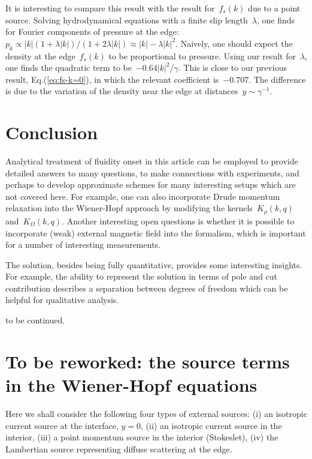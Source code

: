 \documentclass[preprint,aps,eqsecnum]{revtex4-1}
\begin{document}
It is interesting to compare this result with the result for~$f_s(k)$
due to a point source. Solving hydrodynamical equations with a finite
slip length~$\lambda$, one finds for Fourier components of
pressure at the edge:
$p_k \propto |k| (1 + \lambda |k|)/(1 + 2 \lambda|k|)
\approx |k| - \lambda |k|^2$. Naively, one should expect the
density at the edge~$f_s(k)$ to be proportional to pressure.
Using our result for~$\lambda$, one
finds the quadratic term to be~$-0.64 |k|^2/\gamma$. This is close
to our previous result, Eq.(\ref{eq:fs-k=0}), in which the relevant
coefficient is~$-0.707$. The difference is due to the variation
of the density near the edge at distances~$y\sim\gamma^{-1}$.

\section{Conclusion}
\label{sec:conclusion}



Analytical treatment of fluidity onset in this article can be employed
to provide detailed answers to many questions, to make connections with
experiments, and perhaps to develop approximate schemes for many
interesting setups which are not covered here.
For example, one can also incorporate Drude momentum relaxation into
the Wiener-Hopf approach by modifying the kernels~$K_\rho(k, q)$
and~$K_\Omega(k, q)$. Another  interesting open questions is whether it is
possible to incorporate (weak) external magnetic field into the formalism,
which is important for a number of interesting measurements.

The solution, besides being fully quantitative, provides some interesting
insights. For example, the ability to represent the solution in terms of
pole and cut contribution describes a separation between degrees of freedom
which can be helpful for qualitative analysis.

to be continued.



\appendix

\section{To be reworked: the source terms in the Wiener-Hopf equations}
\label{sec:sources}
Here we shall consider the following four
types of external sources: (i) an isotropic current source at the interface,
$y = 0$, (ii) an isotropic current source in the interior,
(iii) a point momentum source in the interior (Stokeslet),
(iv) the Lambertian source representing diffuse scattering at the edge.
\end{document}
